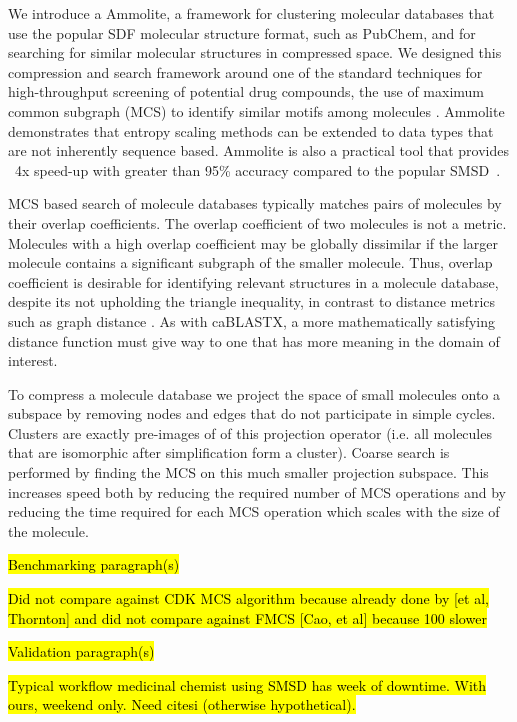 \documentclass[review,preprint,12pt]{elsarticle}
\renewcommand{\cite}{\citep} %
\theoremstyle{definition}
\theoremstyle{remark}
\numberwithin{equation}{section}
\begin{document}
We introduce a Ammolite, a framework for clustering molecular databases that use the 
popular SDF molecular structure format, such as PubChem, and for searching for 
similar molecular structures in compressed space.
We designed this compression and search framework around one of the standard 
techniques for high-throughput screening of potential drug compounds, the use 
of maximum common subgraph (MCS) to identify similar motifs among molecules \cite{cao2008maximum, rahman2009small}.
Ammolite demonstrates that entropy scaling methods can be extended to data types that are not inherently sequence based. Ammolite is also a practical 
tool that provides ~4x speed-up with greater than 95\% accuracy compared to the popular SMSD~\cite{rahman2009small}.

MCS based search of molecule databases typically matches pairs of molecules by 
their overlap coefficients. The overlap coefficient of two molecules is not a 
metric.
Molecules with a high overlap coefficient may be globally dissimilar if the 
larger molecule contains a significant subgraph of the smaller molecule.
Thus, overlap coefficient is desirable for identifying relevant structures in a 
molecule database, despite its not upholding the triangle inequality, in 
contrast to distance metrics such as graph distance \cite{bunke1998graph}.
As with caBLASTX, a more mathematically satisfying distance function must give 
way to one that has more meaning in the domain of interest.

To compress a molecule database we project the space of small molecules onto a subspace by removing nodes and edges that do not participate in simple cycles.
Clusters are exactly pre-images of of this projection operator (i.e. all molecules that are isomorphic after simplification form a cluster).
Coarse search is performed by finding the MCS on this much smaller projection subspace. This increases speed both by reducing the required number of MCS operations 
and by reducing the time required for each MCS operation which scales with the size of the molecule.

\hl{Benchmarking paragraph(s)}



\hl{Did not compare against CDK MCS algorithm because already done by [et al, Thornton] and did not compare against FMCS [Cao, et al] because 100 slower}

\hl{Validation paragraph(s)}

\hl{Typical workflow medicinal chemist using SMSD has week of downtime. With ours, weekend only. Need citesi (otherwise hypothetical).}
\end{document}
